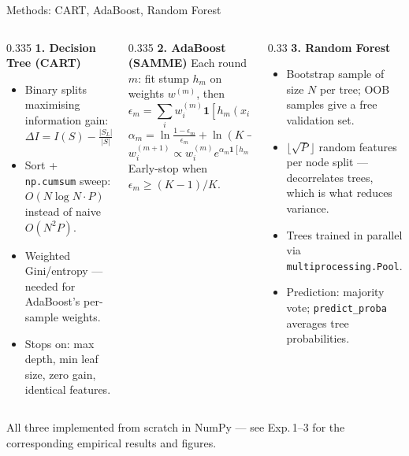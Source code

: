 \documentclass[aspectratio=169,10pt]{beamer}
\begin{document}
\begin{frame}{Methods: CART, AdaBoost, Random Forest}
  \begin{columns}[T]
    \begin{column}{0.335\textwidth}
      \textbf{\small 1. Decision Tree (CART)}
      \begin{itemize}\scriptsize
        \item Binary splits maximising information gain:
        \[
        \Delta I = I(S) - \tfrac{|S_L|}{|S|}I(S_L) - \tfrac{|S_R|}{|S|}I(S_R)
        \]
        \item Sort + \texttt{np.cumsum} sweep: $O(N\!\log\!N \cdot P)$ instead of naive $O(N^2 P)$.
        \item Weighted Gini/entropy — needed for AdaBoost's per-sample weights.
        \item Stops on: max depth, min leaf size, zero gain, identical features.
      \end{itemize}
    \end{column}
    \begin{column}{0.335\textwidth}
      \textbf{\small 2. AdaBoost (SAMME)}
      \scriptsize Each round $m$: fit stump $h_m$ on weights $w^{(m)}$, then
      \[
      \epsilon_m = \textstyle\sum_i w_i^{(m)}\mathbf{1}[h_m(x_i)\neq y_i]
      \]
      \[
      \alpha_m = \ln\!\tfrac{1-\epsilon_m}{\epsilon_m} + \ln(K-1)
      \]
      \[
      w_i^{(m+1)} \propto w_i^{(m)}e^{\alpha_m \mathbf{1}[h_m(x_i)\neq y_i]}
      \]
      Early-stop when $\epsilon_m \ge (K-1)/K$.
    \end{column}
    \begin{column}{0.33\textwidth}
      \textbf{\small 3. Random Forest}
      \begin{itemize}\scriptsize
        \item Bootstrap sample of size $N$ per tree; OOB samples give a free validation set.
        \item $\lfloor\sqrt{P}\rfloor$ random features per node split — decorrelates trees, which is what reduces variance.
        \item Trees trained in parallel via \texttt{multiprocessing.Pool}.
        \item Prediction: majority vote; \texttt{predict\_proba} averages tree probabilities.
      \end{itemize}
    \end{column}
  \end{columns}
  \vspace{6pt}
  \scriptsize\centering All three implemented from scratch in NumPy — see Exp.\,1--3 for the corresponding empirical results and figures.
\end{frame}
\end{document}
